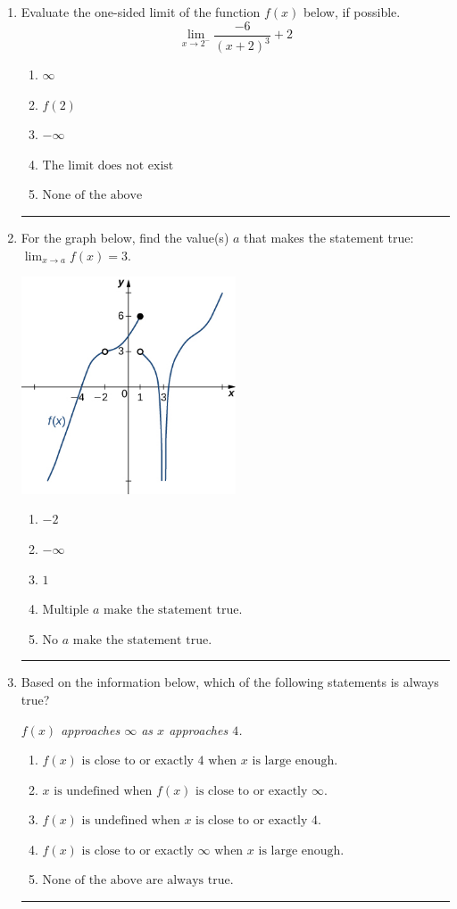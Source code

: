 \documentclass[14pt]{extbook}
\newcommand{\litem}[1]{\item#1\hspace*{-1cm}\rule{\textwidth}{0.4pt}}
\begin{document}
\begin{enumerate}
{\begin{enumerate}[label=\Alph*.]
\end{enumerate} }
\litem{
Evaluate the one-sided limit of the function $f(x)$ below, if possible.\[ \lim_{x \rightarrow 2^-} \frac{-6}{(x+2)^3}+2 \]\begin{enumerate}[label=\Alph*.]
\item \( \infty \)
\item \( f(2) \)
\item \( -\infty \)
\item \( \text{The limit does not exist} \)
\item \( \text{None of the above} \)

\end{enumerate} }
\litem{
For the graph below, find the value(s) $a$ that makes the statement true: $ \displaystyle \lim_{x \rightarrow a} f(x) = 3$.
\begin{center}
    \includegraphics[width=0.5\textwidth]{../Figures/evaluateLimitGraphicallyCopyC.png}
\end{center}
\begin{enumerate}[label=\Alph*.]
\item \( -2 \)
\item \( -\infty \)
\item \( 1 \)
\item \( \text{Multiple } a \text{ make the statement true}. \)
\item \( \text{No } a \text{ make the statement true}. \)

\end{enumerate} }
\litem{
Based on the information below, which of the following statements is always true?
\begin{center}
    \textit{ $f(x)$ approaches $\infty$ as $x$ approaches $4$. }
\end{center}
\begin{enumerate}[label=\Alph*.]
\item \( f(x) \text{ is close to or exactly } 4 \text{ when } x \text{ is large enough}. \)
\item \( x \text{ is undefined when } f(x) \text{ is close to or exactly } \infty. \)
\item \( f(x) \text{ is undefined when } x \text{ is close to or exactly } 4. \)
\item \( f(x) \text{ is close to or exactly } \infty \text{ when } x \text{ is large enough}. \)
\item \( \text{None of the above are always true.} \)


\end{enumerate}}
\end{enumerate}
\end{document}
